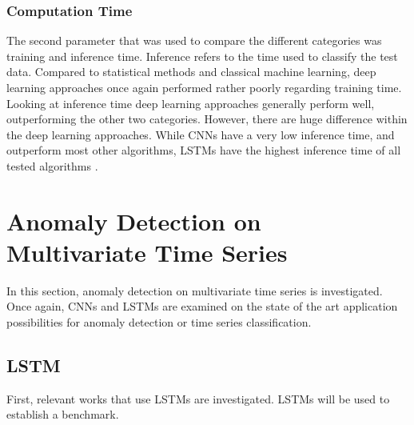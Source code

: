 \subsubsection{Computation Time}
The second parameter that was used to compare the different categories was training and inference time. Inference refers to the time used to classify the test data. Compared to statistical methods and classical machine learning, deep learning approaches once again performed rather poorly regarding training time. Looking at inference time deep learning approaches generally perform well, outperforming the other two categories. However, there are huge difference within the deep learning approaches. While CNNs have a very low inference time, and outperform most other algorithms, LSTMs have the highest inference time of all tested algorithms \parencite{Braei2020}.  


\section{Anomaly Detection on Multivariate Time Series}
In this section, anomaly detection on multivariate time series is investigated. Once again, CNNs and LSTMs are examined on the state of the art application possibilities for anomaly detection or time series classification.

\subsection{LSTM}
First, relevant works that use LSTMs are investigated. LSTMs will be used to establish a benchmark.

